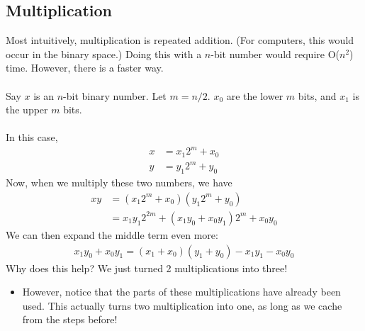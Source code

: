 \documentclass[10pt]{article}
\begin{document}
\subsection*{Multiplication}
Most intuitively, multiplication is repeated addition.  (For computers, this would occur in the binary space.)  Doing this with a $n$-bit number would require O($n^2$) time.  However, there is a faster way.\\\\
Say $x$ is an $n$-bit binary number.  Let $m = n / 2$.  $x_0$ are the lower $m$ bits, and $x_1$ is the upper $m$ bits.\\\\
In this case,
\begin{align*}
    x &= x_1 2^m + x_0\\
    y &= y_1 2^m + y_0
\end{align*}
Now, when we multiply these two numbers, we have
\begin{align*}
    xy &= (x_1 2^m + x_0)(y_1 2^m + y_0)\\
    &= x_1 y_1 2^{2m} + (x_1 y_0 + x_0 y_1) 2^m + x_0 y_0
\end{align*}
We can then expand the middle term even more:
\begin{align*}
    x_1 y_0 + x_0 y_1 = (x_1 + x_0)(y_1 + y_0) - x_1 y_1 - x_0 y_0
\end{align*}
Why does this help?  We just turned 2 multiplications into three!
\begin{itemize}
	\item However, notice that the parts of these multiplications have already been used.  This actually turns two multiplication into one, as long as we cache from the steps before!
\end{itemize}
\end{document}

